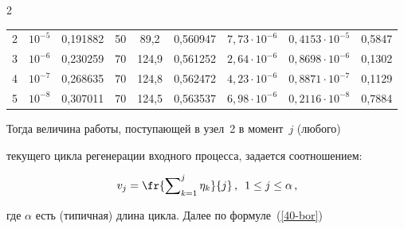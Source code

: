 \begin{multicols}{2}
\begin{table}
\begin{center}
\begin{tabular}{|c|c|c|c|c|c|c|c|c|}

2 &  $10^{-5}$ & 0,191882 & 50 & \hphantom{9}89,2 & 0,560947 & $7{,}73\cdot 10^{-6}$ & $0{,}4153 \cdot 10^{-5}$ & 0,5847\\



3 &  $10^{-6}$ & 0,230259 & 70 & 124,9& 0,561252 &  $2{,}64\cdot 10^{-6}$ & $0{,}8698 \cdot 10^{-6}$ & 0,1302\\



4 &  $10^{-7}$ & 0,268635 & 70 & 124,8 & 0,562472 &  $4{,}23\cdot 10^{-6}$ & $0{,}8871 \cdot 10^{-7}$ & 0,1129\\



5 &  $10^{-8}$ &  0,307011 & 70 & 124,5 & 0,563537  &  $6{,}98\cdot 10^{-6}$ & $0{,}2116 \cdot 10^{-8}$ & 0,7884\\

\hline

\end{tabular}

\end{center}

\vspace*{-6pt}

\end{table}



\noindent

Тогда  величина работы, поступающей в узел~2 в момент~$j$ (любого)

текущего цикла регенерации входного процесса, задается соотношением:



\noindent

\begin{equation}

v_j = \fr{\sum\nolimits_{k=1}^{j}\eta_k}{j}\,,\enskip 1 \le j \le \alpha\,,

\label{dependence}

\end{equation}

где    $\alpha$  есть (типичная) длина цикла. Далее по формуле~(\ref{40-bor})  


\end{multicols}
